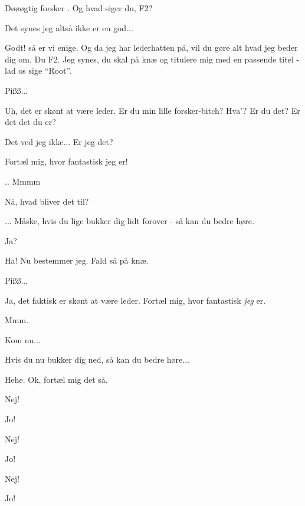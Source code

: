 \documentclass[a4paper,11pt]{article}
\begin{document}
\begin{sketch}
 Døøøgtig forsker . Og hvad siger du, F2?

 Det synes jeg altså ikke er en god...  

  Godt! så er vi enige. Og da jeg har
lederhatten på, vil du gøre alt hvad jeg beder dig om. Du F2. Jeg
synes, du skal på knæ og titulere mig med en passende titel - lad os
sige ``Root''.

  Pißß...

 Uh, det er skønt at være leder. Er du min lille
forsker-bitch? Hva'? Er du det? Er det det du er?

  Det ved jeg ikke... Er jeg det?

 Fortæl mig, hvor fantastisk jeg er!

 .. Mmmm

 Nå, hvad bliver det til?

 ... Måske, hvis du lige bukker dig lidt forover - så kan du
bedre høre.

  Ja?

 


 Ha! Nu bestemmer jeg. Fald så på knæ.

  Pißß...

 Ja, det faktisk er skønt at være leder. Fortæl mig, hvor
fantastisk \emph{jeg} er.

 Mmm.

 Kom nu...

  Hvis du nu bukker dig ned, så kan du
bedre høre...

  Hehe. Ok, fortæl mig det så.

 


 Nej!

 Jo!

 Nej!

 Jo!

 Nej!

 Jo! 


\end{sketch}
\end{document}
